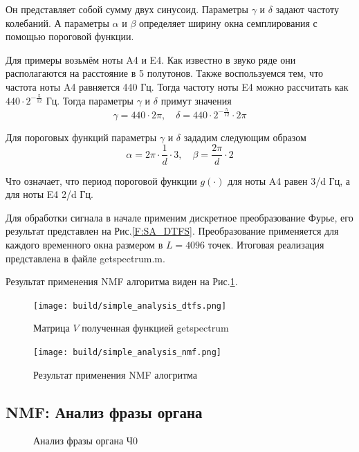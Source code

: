 \documentclass[oneside, final, 12pt]{extarticle}
\begin{document}
Он представляет собой сумму двух синусоид.
Параметры $\gamma$ и $\delta$ задают частоту колебаний.
А параметры $\alpha$ и $\beta$ определяет ширину окна
семплирования с помощью пороговой функции.

Для примеры возьмём ноты A4 и E4. Как известно в звуко ряде
они располагаются на расстояние в 5 полутонов. Также воспользуемся
тем, что частота ноты A4 равняется 440 Гц. Тогда частоту ноты
E4 можно рассчитать как $440 \cdot 2^{-\frac{5}{12}}$ Гц.
Тогда параметры $\gamma$ и $\delta$ примут значения
\[
  \gamma = 440 \cdot 2 \pi, \quad
  \delta = 440 \cdot 2^{-\frac{5}{12}} \cdot 2 \pi
\]

Для пороговых функций параметры $\gamma$ и $\delta$ зададим следующим
образом
\[
  \alpha = 2 \pi \cdot \frac{1}{d} \cdot 3, \quad
  \beta = \frac{2 \pi}{d} \cdot 2
\]

Что означает, что период пороговой функции $g(\cdot)$ для ноты A4
равен 3/d Гц, а для ноты E4 2/d Гц.

Для обработки сигнала в начале применим дискретное преобразование Фурье,
его результат представлен на Рис.\ref{F:SA_DTFS}. Преобразование
применяется для каждого временного окна размером в $L = 4096$ точек.
Итоговая реализация представлена в файле getspectrum.m.

Результат применения NMF алгоритма виден на Рис.\ref{F:SANMF}.

\begin{figure}[t]
  \begin{multicols}{2}
    \hfill
    \texttt{[image: build/simple\_analysis\_dtfs.png]}
    \hfill
    \caption{Матрица $V$ полученная функцией getspectrum}
      \label{F:SA_DTFS}
    \hfill
    \texttt{[image: build/simple\_analysis\_nmf.png]}
    \hfill
    \caption{Результат применения NMF алогритма}
      \label{F:SANMF}
  \end{multicols}
\end{figure}

\cleardoublepage

\subsection{NMF: Анализ фразы органа}

\begin{figure}
  \centering
  \centering
  \caption{Анализ фразы органа Ч0}
    \label{F:5-3-p0}
\end{figure}
\end{document}
